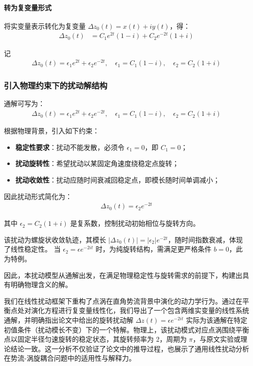 \paragraph{转为复变量形式}
将实变量表示转化为复变量 $\Delta z_0(t) = x(t) + i y(t)$，得：
\begin{align*}
    \Delta z_0(t) &= C_1 e^{2t} (1 - i) + C_2 e^{-2t} (1 + i)
\end{align*}

记
\begin{align*}
    \Delta z_0(t) = \epsilon_1 e^{2t} + \epsilon_2 e^{-2t}, \quad
    \epsilon_1 = C_1(1 - i), \quad
    \epsilon_2 = C_2(1 + i)
\end{align*}
\subsubsection{引入物理约束下的扰动解结构}

通解可写为：
\begin{align*}
    \Delta z_0(t) = \epsilon_1 e^{2t} + \epsilon_2 e^{-2t}, \quad
    \epsilon_1 = C_1(1 - i), \quad \epsilon_2 = C_2(1 + i)
\end{align*}

根据物理背景，引入如下约束：

\begin{itemize}
    \item \textbf{稳定性要求}：扰动不能发散，必须令 $\epsilon_1 = 0$，即 $C_1 = 0$；
    \item \textbf{扰动旋转性}：希望扰动以某固定角速度绕稳定点旋转；
    \item \textbf{扰动收敛性}：扰动应随时间衰减回稳定点，即模长随时间单调减小；
\end{itemize}

因此扰动形式简化为：
\begin{align*}
    \Delta z_0(t) = \epsilon_2 e^{-2t}
\end{align*}

其中 $\epsilon_2 = C_2(1 + i)$ 是复系数，控制扰动初始相位与旋转方向。

该扰动为螺旋状收敛轨迹，其模长 $|\Delta z_0(t)| = |\epsilon_2| e^{-2t}$，随时间指数衰减，体现了线性稳定性。
当 $\epsilon_2 = \epsilon e^{-2it}$ 时，为纯旋转结构，需满足更严格条件 $b=0$，此为特例。

因此，本扰动模型从通解出发，在满足物理稳定性与旋转需求的前提下，构建出具有明确物理含义的解。


我们在线性扰动框架下重构了点涡在直角势流背景中演化的动力学行为。通过在平衡点处对演化方程进行复变量线性化，我们导出了一个包含两维实变量的线性系统通解，并明确指出论文中给出的旋转扰动解 $\Delta z(t) = \epsilon e^{-2it}$ 实际为该通解在特定初值条件（扰动模长不变）下的一个特解。物理上，该扰动模式对应点涡围绕平衡点以固定半径匀速旋转的稳定状态，其旋转频率为 2，周期为 $\pi$，与原文实验或理论结论一致。这一分析不仅验证了论文中的推导过程，也展示了通用线性扰动分析在势流-涡旋耦合问题中的适用性与解释力。

